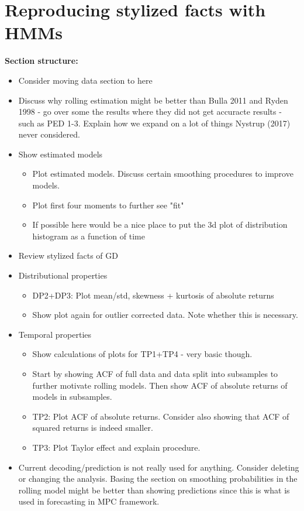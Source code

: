 \newpage

\section{Reproducing stylized facts with HMMs}
\label{Section: Stylized facts}


\textbf{Section structure:}
\begin{itemize}
    \item Consider moving data section to here
    \item Discuss why rolling estimation might be better than Bulla 2011 and Ryden 1998 - go over some the results where they did not get accuracte results - such as PED 1-3. Explain how we expand on a lot of things Nystrup (2017) never considered.
    \item Show estimated models
    \begin{itemize}
        \item Plot estimated models. Discuss certain smoothing procedures to improve models.
        \item Plot first four moments to further see "fit"
        \item If possible here would be a nice place to put the 3d plot of distribution histogram as a function of time
    \end{itemize} 
    \item Review stylized facts of GD
    \item Distributional properties
    \begin{itemize}
        \item DP2+DP3: Plot mean/std, skewness + kurtosis of absolute returns
        \item Show plot again for outlier corrected data. Note whether this is necessary.
    \end{itemize}
    \item Temporal properties
    \begin{itemize}
        \item Show calculations of plots for TP1+TP4 - very basic though.
        \item Start by showing ACF of full data and data split into subsamples to further motivate rolling models. Then show ACF of absolute returns of models in subsamples.
        \item TP2: Plot ACF of absolute returns. Consider also showing that ACF of squared returns is indeed smaller.
        \item TP3: Plot Taylor effect and explain procedure.
        
    \end{itemize}
    \item Current decoding/prediction is not really used for anything. Consider deleting or changing the analysis. Basing the section on smoothing probabilities in the rolling model might be better than showing predictions since this is what is used in forecasting in MPC framework.
\end{itemize}

